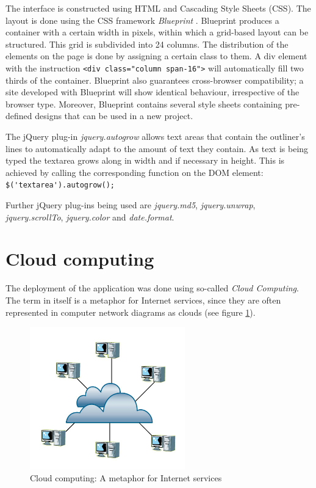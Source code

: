 The interface is constructed using HTML and Cascading Style Sheets (CSS). The layout is done using the CSS framework \textit{Blueprint} \cite{blueprint:website}. Blueprint produces a container with a certain width in pixels, within which a grid-based layout can be structured. This grid is subdivided into 24 columns. The distribution of the elements on the page is done by assigning a certain {\selectfont class} to them. A {\selectfont div} element with the instruction \lstinline!<div class="column span-16">! will automatically fill two thirds of the container. Blueprint also guarantees cross-browser compatibility; a site developed with Blueprint will show identical behaviour, irrespective of the browser type. Moreover, Blueprint contains several style sheets containing pre-defined designs that can be used in a new project.

The jQuery plug-in \textit{jquery.autogrow} \cite{jquery:autogrow} allows text areas that contain the outliner's lines to automatically adapt to the amount of text they contain. As text is being typed the textarea grows along in width and if necessary in height. This is achieved by calling the corresponding function on the DOM element: \lstinline!$('textarea').autogrow();! 

Further jQuery plug-ins being used are \textit{jquery.md5}, \textit{jquery.unwrap}, \textit{jquery.scrollTo}, \textit{jquery.color} and \textit{date.format}.


\section{Cloud computing}
\label{sec:cloud}

The deployment of the application was done using so-called \textit{Cloud Computing}. The term in itself is a metaphor for Internet services, since they are often represented in computer network diagrams as clouds (see figure \ref{fig:cloud-computing}).

\medskip
\begin{figure}[ht] 
  \begin{center}
    \includegraphics[width=0.6\textwidth]{grafik/cloud-computing} 
  \end{center}
  \caption{Cloud computing: A metaphor for Internet services \cite{cloud:graphic}}
  \label{fig:cloud-computing}
\end{figure}

